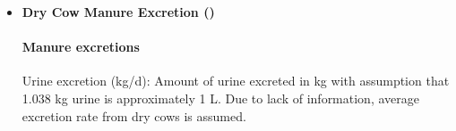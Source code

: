 \begin{refsection}
\begin{itemize}
Urine N excretion (kg/d)
        \vspace{0.5cm}
    
    \begin{center}
        \(
\text{urine}_{\text{nitrogen}} = \text{manure}_{\text{nitrogen}} - \text{fecal}_{\text{nitrogen}}
\)

    \end{center}
        \vspace{0.5cm} 
    
            {\raggedleft \textbf{[AN.EXC.16]}\par}
            \vspace{0.5cm}

Manure total ammoniacal nitrogen (kg/d) 
        \vspace{0.5cm}
    
    \begin{center}
        \(manure\_total\_ammoniacal\_nitrogen = urine\_nitrogen\)
    \end{center}
        \vspace{0.5cm} 
    
            {\raggedleft \textbf{[AN.EXC.9]}\par}
            \vspace{0.5cm} 

Manure K excretion (g/d)
        \vspace{0.5cm}
    
    \begin{center}
        \(Potassium = 7.21 * dry\_matter\_intake + 15944 * \frac{potassium\_concentration }{100} - 164.5
\)
    \end{center}
        \vspace{0.5cm} 
    
            {\raggedleft \textbf{[AN.EXC.27]}\par}
            \vspace{0.5cm} 

\item \textbf{Dry Cow Manure Excretion ()}

\paragraph{Manure excretions}
\vspace{-0.25cm}

Urine excretion (kg/d): Amount of urine excreted in kg with assumption that 1.038 kg urine is approximately 1 L. Due to lack of information, average excretion rate from dry cows is assumed.
        \vspace{0.5cm}
    

\end{itemize}
\end{refsection}
